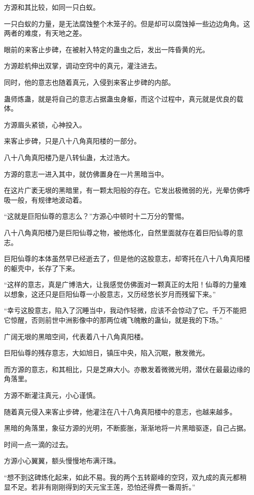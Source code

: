 \begin{this_body}
方源和其比较，如同一只白蚁。

一只白蚁的力量，是无法腐蚀整个木笼子的。但是却可以腐蚀掉一些边边角角。这两者的难度，有天地之差。

眼前的来客止步碑，在被射入特定的蛊虫之后，发出一阵昏黄的光。

方源趁机伸出双掌，调动空窍中的真元，灌注进去。

同时，他的意志也随着真元，入侵到来客止步碑的内部。

蛊师炼蛊，就是将自己的意志占据蛊虫身躯，而这个过程中，真元就是优良的载体。

方源眉头紧锁，心神投入。

来客止步碑，只是八十八角真阳楼的一部分。

八十八角真阳楼乃是八转仙蛊，太过浩大。

方源的意志一进入其中，就仿佛置身在一片黑暗当中。

在这片广袤无垠的黑暗里，有一颗太阳般的存在。它发出极微弱的光，光晕仿佛呼吸一般，有规律地波动着。

“这就是巨阳仙尊的意志么？”方源心中顿时十二万分的警惕。

八十八角真阳楼乃是巨阳仙尊之物，被他炼化，自然里面就存在着巨阳仙尊的意志。

巨阳仙尊的本体虽然早已经逝去了，但是他的这股意志，却寄托在八十八角真阳楼的躯壳中，长存了下来。

“这样的意志，真是广博浩大，让我感觉仿佛面对一颗真正的太阳！仙尊的力量难以想象，这还只是巨阳仙尊一小股意志，又历经悠长岁月而残留下来。”

“幸亏这股意志，陷入了沉睡当中，我动作轻微，应该不会惊动了它。千万不能把它惊醒，否则前世中洲影像中的那两位魂飞魄散的蛊仙，就是我的下场。”

广阔无垠的黑暗空间，代表着八十八角真阳楼。

巨阳仙尊的残存意志，大如旭日，镇压中央，陷入沉眠，散发微光。

而方源的意志，和其相比，只是芝麻大小。亦散发着微微光明，潜伏在最最边缘的角落里。

方源不断灌注真元，小心谨慎。

随着真元侵入来客止步碑，他灌注在八十八角真阳楼中的意志，也越来越多。

黑暗的角落里，象征方源的光明，不断膨胀，渐渐地将一片黑暗驱逐，自己占据。

时间一点一滴的过去。

方源小心翼翼，额头慢慢地布满汗珠。

“想不到这碑炼化起来，如此不易。我的两个五转巅峰的空窍，双九成的真元都稍显不足。若非有刚刚得到的天元宝王莲，恐怕还得费一番周折。”


\end{this_body}
